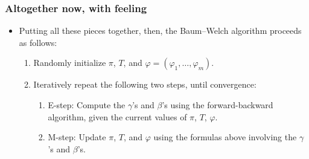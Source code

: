 \documentclass[12pt]{article}
\begin{document}
\subsubsection{Altogether now, with feeling}
\begin{itemize}
\item Putting all these pieces together, then, the Baum--Welch algorithm proceeds as follows:
\begin{enumerate}
\item Randomly initialize $\pi$, $T$, and $ \varphi = (\varphi_1,\ldots,\varphi_m)$.
\item Iteratively repeat the following two steps, until convergence:
\begin{enumerate}
\item E-step: Compute the $\gamma$'s and $\beta$'s using the forward-backward algorithm, given the current values of $\pi$, $T$, $\varphi$.
\item M-step: Update $\pi$, $T$, and $\varphi$ using the formulas above involving the $\gamma$'s and $\beta$'s.
\end{enumerate}
\end{enumerate}
\end{itemize}
\end{document}
